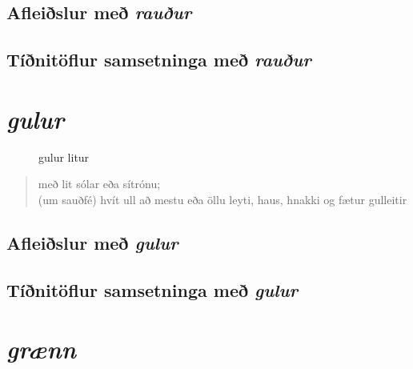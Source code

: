 \documentclass[12pt,b5paper,twosided,openany]{book}
\begin{document}
\section{Afleiðslur með \textit{rauður}}
\label{afl:raudafl}


\section{Tíðnitöflur samsetninga með \textit{rauður}}
\label{tidni:raudtid}


\chapter{\textit{gulur}}
\label{kafli:gulur}

\begin{figure}[H]
\begin{tcolorbox}
	\centering
\end{tcolorbox}
	\caption{gulur litur}
	\label{mynd:gult}
\end{figure}

\begin{quote}
með lit sólar eða sítrónu; \\
(um sauðfé) hvít ull að mestu eða öllu leyti, haus, hnakki og fætur gulleitir
\end{quote}
\clearpage

\section{Afleiðslur með \textit{gulur}}
\label{afl:gulafl}


\section{Tíðnitöflur samsetninga með \textit{gulur}}
\label{tidni:gulur}


\chapter{\textit{grænn}}
\label{kafli:graenn}
\end{document}
